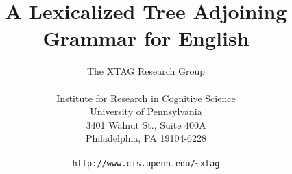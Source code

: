 \title{A  Lexicalized Tree Adjoining Grammar for English}
\author{The XTAG Research Group \\ \\
Institute for Research in Cognitive Science\\
University of Pennsylvania \\
3401 Walnut St., Suite 400A \\
Philadelphia, PA 19104-6228 \\ \\
{\tt http://www.cis.upenn.edu/\~{}xtag}
}
\bigskip
\makeindex
\oddsidemargin 0.25in
\evensidemargin 0.25in
\topmargin 0in
\textheight 8.5in
\textwidth 6.25in

%
%
%





\newcommand{\vertical}[1]{
\setlength{\unitlength}{0.012500in}%
\hspace*{2pt}
\begin{picture}(12,12)(0,0)
\put(0,0){\makebox(0,0)[lb]{\raisebox{0pt}[0pt][0pt]{\special{ps:gsave currentpoint currentpoint translate
-90.0 rotate neg exch neg exch translate}\rm #1\special{ps:currentpoint grestore moveto}}}}
\end{picture}
\hspace*{-18pt}
}

\newcommand{\xtagdef}[1]{{\sc #1}}
\newcommand{\xtagcheck}{$\surd$}

\setcounter{secnumdepth}{3}
\setcounter{tocdepth}{3}


\setcounter{bottomnumber}{20}
\setcounter{topnumber}{20}
\renewcommand{\bottomfraction}{1}
\renewcommand{\topfraction}{1}
\setcounter{totalnumber}{30}
\renewcommand{\textfraction}{0}
\renewcommand{\floatpagefraction}{0}

\pagestyle{plain}

